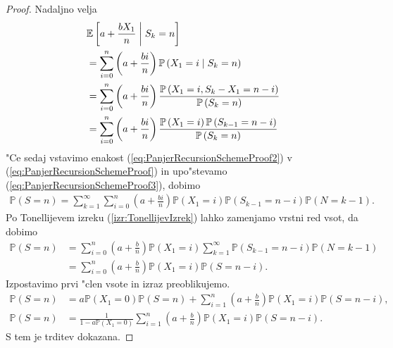 \documentclass[12pt, a4paper, reqno]{amsart}
\theoremstyle{definition}
\theoremstyle{plain}
\newcommand{\E}{\mathbb{E}}
\newcommand{\Prob}{\mathbb{P}}
\newcommand{\1}{\mathds{1}}
\begin{document}
\begin{proof}
        Nadaljno velja  
        \begin{align}   
            & \E\left[a + \frac{bX_1}{n} \biggm|   S_k = n\right] \nonumber \\
            &= \sum_{i = 0}^n\left(a + \frac{bi}{n}\right)\Prob\left(X_1 = i\mid S_k = n\right) \nonumber \\
            &= \sum_{i = 0}^n\left(a + \frac{bi}{n}\right)\frac{\Prob\left(X_1 = i, S_k - X_1 = n - i\right)}{\Prob\left(S_k = n\right)} \nonumber \\
            &= \sum_{i = 0}^n\left(a + \frac{bi}{n}\right)\frac{\Prob\left(X_1 = i\right)\Prob\left(S_{k- 1} = n - i\right)}{\Prob\left(S_k = n\right)} \label{eq:PanjerRecursionSchemeProof3} 
        \end{align}
        "Ce sedaj vstavimo enakost (\ref{eq:PanjerRecursionSchemeProof2}) v (\ref{eq:PanjerRecursionSchemeProof}) 
        in upo"stevamo (\ref{eq:PanjerRecursionSchemeProof3}), dobimo
        \begin{align*}
            \Prob\left(S = n\right) 
                = \sum_{k = 1}^\infty\sum_{i = 0}^n \left(a + \frac{bi}{n}\right)\Prob\left(X_1 = i\right)\Prob\left(S_{k - 1} = n - i\right)\Prob\left(N = k - 1\right).
        \end{align*}
        Po Tonellijevem izreku (\ref{izr:TonellijevIzrek}) lahko zamenjamo vrstni red vsot, da dobimo
        \begin{align*}
            \Prob\left(S = n\right) 
                &= \sum_{i = 0}^n\left(a + \frac{b}{n}\right)\Prob\left(X_1 = i\right)\sum_{k = 1}^\infty\Prob\left(S_{k - 1} = n - i\right)\Prob\left(N = k - 1\right)\\
                &= \sum_{i = 0}^n\left(a + \frac{b}{n}\right)\Prob\left(X_1 = i\right)\Prob\left(S = n - i\right).
        \end{align*}
        Izpostavimo prvi "clen vsote in izraz preoblikujemo.
        \begin{align*}
            \Prob\left(S = n\right) 
                &= a\Prob\left(X_1 = 0\right)\Prob\left(S = n\right) + \sum_{i = 1}^n\left(a + \frac{b}{n}\right)\Prob\left(X_1 = i\right)\Prob\left(S = n - i\right), \\
            \Prob\left(S = n\right)
                &= \frac{1}{1 - a\Prob\left(X_1 = 0\right)}\sum_{i = 1}^n\left(a + \frac{b}{n}\right)\Prob\left(X_1 = i\right)\Prob\left(S = n - i\right).
        \end{align*}
        S tem je trditev dokazana.
    \end{proof}
\end{document}
